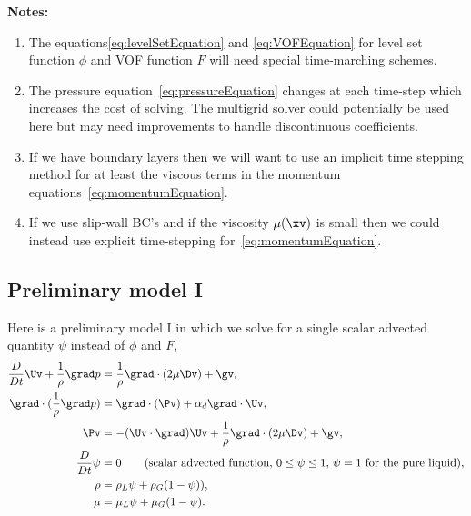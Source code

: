 \documentclass[11pt]{article}
\begin{document}
{\bf Notes:}
\begin{enumerate}
  \item The equations\eqref{eq:levelSetEquation} and \eqref{eq:VOFEquation} 
        for level set function $\phi$ and VOF function $F$ will need special time-marching schemes. 
  \item The pressure equation~\eqref{eq:pressureEquation} changes at each time-step which increases the
     cost of solving. The multigrid solver could potentially be used here but may need improvements to
     handle discontinuous coefficients. 
  \item If we have boundary layers then we will want to use an implicit time stepping method for at least 
        the viscous terms in the momentum equations~\eqref{eq:momentumEquation}.
  \item If we use slip-wall BC's and if the viscosity $\mu(\xv)$ is small then we could instead use
        explicit time-stepping for~\eqref{eq:momentumEquation}.
\end{enumerate} 


\subsection{Preliminary model I}

Here is a preliminary model I in which we solve for a single scalar advected quantity $\psi$ instead of
$\phi$ and $F$, 
\begin{align}
{D\over Dt} \Uv + \rhoi \grad p &=  \rhoi\grad\cdot(2\mu \Dv) + \gv , \label{eq:momentumEquationI} \\
\grad\cdot( \rhoi \grad p ) &= \grad\cdot( \Pv)  + \alpha_d \grad\cdot\Uv , \label{eq:pressureEquationI} \\
 \Pv &= - (\Uv\cdot\grad) \Uv + \rhoi \grad\cdot( 2\mu \Dv) + \gv , \\
{D\over Dt}\psi &= 0 \qquad\text{(scalar advected function, $0\le \psi \le 1$, $\psi=1$ for the pure liquid)}, \\
   \rho &= \rho_L \psi + \rho_G(1-\psi)) , \\
   \mu &= \mu_L \psi + \mu_G(1- \psi) . \\
\end{align}



\vfill\eject


\end{document}
